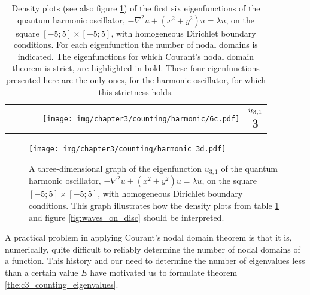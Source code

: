 \begin{table}
\begin{center}
\begin{tabular}{rlrl|rl|}
      \cline{3-6}                                                                                        &                                                      &                                                                                                    &                               & \parbox[c]{\hoWidth}{\vspace{2pt}\texttt{[image: img/chapter3/counting/harmonic/6c.pdf]}\vspace{2pt}} & $ \begin{matrix} u_{3,1} \vspace{5pt}\\ \scalebox{1.5}{$3$} \end{matrix} $  \\
    \end{tabular}
    \caption{\label{tab:courant_harmonic}Density plots (see also figure \ref{fig:harmonic_3d}) of the first six eigenfunctions of the quantum harmonic oscillator, $-\nabla^2 u + (x^2+y^2) u = \lambda u$, on the square $[-5;5]\times [-5;5]$, with homogeneous Dirichlet boundary conditions. For each eigenfunction the number of nodal domains is indicated. The eigenfunctions for which Courant's nodal domain theorem is strict, are highlighted in bold. These four eigenfunctions presented here are the only ones, for the harmonic oscillator, for which this strictness holds. }
  \end{center}
\end{table}

\begin{figure}
  \begin{center}
    \texttt{[image: img/chapter3/counting/harmonic\_3d.pdf]}
    \caption{\label{fig:harmonic_3d} A three-dimensional graph of the eigenfunction $u_{3,1}$ of the quantum harmonic oscillator, $-\nabla^2 u + (x^2+y^2) u = \lambda u$, on the square $[-5; 5] \times [-5; 5]$, with homogeneous Dirichlet boundary conditions. This graph illustrates how the density plots from table \ref{tab:courant_harmonic} and figure \ref{fig:waves_on_disc} should be interpreted.}
  \end{center}
\end{figure}

A practical problem in applying Courant's nodal domain theorem is that it is, numerically, quite difficult to reliably determine the number of nodal domains of a function. This history and our need to determine the number of eigenvalues less than a certain value $E$ have motivated us to formulate theorem \ref{the:c3_counting_eigenvalues}.


